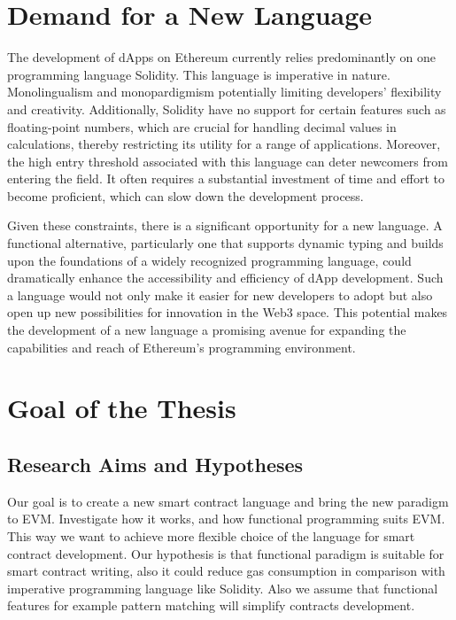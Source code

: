 \section{Demand for a New Language}

The development of dApps on Ethereum currently relies predominantly on one programming language Solidity. This language is imperative in nature. Monolingualism and monopardigmism potentially limiting developers' flexibility and creativity. Additionally, Solidity have no support for certain features such as floating-point numbers, which are crucial for handling decimal values in calculations, thereby restricting its utility for a range of applications. Moreover, the high entry threshold associated with this language can deter newcomers from entering the field. It often requires a substantial investment of time and effort to become proficient, which can slow down the development process.

Given these constraints, there is a significant opportunity for a new language. A functional alternative, particularly one that supports dynamic typing and builds upon the foundations of a widely recognized programming language, could dramatically enhance the accessibility and efficiency of dApp development. Such a language would not only make it easier for new developers to adopt but also open up new possibilities for innovation in the Web3 space. This potential makes the development of a new language a promising avenue for expanding the capabilities and reach of Ethereum's programming environment.

\section{Goal of the Thesis}

\subsection{Research Aims and Hypotheses}
Our goal is to create a new smart contract language and bring the new paradigm to EVM. Investigate how it works, and how functional programming suits EVM. This way we want to achieve more flexible choice of the language for smart contract development.
Our hypothesis is that functional paradigm is suitable for smart contract writing, also it could reduce gas consumption in comparison with imperative programming language like Solidity. Also we assume that functional features for example pattern matching will simplify contracts development.

